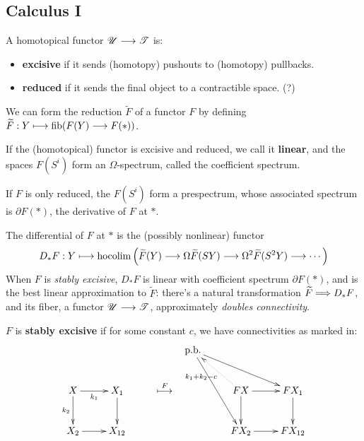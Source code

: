 \documentclass[11pt]{article}
\begin{document}
\begin{Calculus I}
\section*{Calculus I}
\begin{itemise}
\setlength{\parindent}{.25in}
\item A homotopical functor $\mathscr{U}\longrightarrow\mathscr{T}$ is:
\begin{itemize}\squishlist
\setlength{\parindent}{.25in}
\item  \textbf{excisive} if it sends (homotopy) pushouts to (homotopy) pullbacks.
\item \textbf{reduced} if it sends the final object to a contractible space. (?)
\end{itemize}
\item We can  form the reduction $\widetilde{F}$ of a functor $F$ by defining $\widetilde{F}:Y\longmapsto\operatorname{fib}(F(Y)\longrightarrow F(*))$.
\item If the (homotopical) functor is excisive and reduced, we call it \textbf{linear}, and the spaces $F(S^i)$ form an $\Omega$-spectrum, called the coefficient spectrum.
\item If $F$ is only reduced, the $F(S^i)$ form a prespectrum, whose associated spectrum is $\partial F(*)$, the derivative of $F$ at $*$.
\item The differential of $F$ at $*$ is the (possibly nonlinear) functor
\[D_*F:Y\longmapsto\operatorname*{hocolim}\left(\widetilde{F}(Y)\longrightarrow\Omega\widetilde{F}(SY)\longrightarrow\Omega^2\widetilde{F}(S^2Y)\longrightarrow\cdots \right)\]
When $F$ is \emph{stably excisive}, $D_*F$ is linear with coefficient spectrum $\partial F(*)$, and is the best linear approximation to $\widetilde{F}$: there's a natural transformation $\widetilde{F}\Longrightarrow D_*F$, and its fiber, a functor $\mathscr{U}\longrightarrow\mathscr{T}$, approximately \emph{doubles connectivity}.

$F$ is \textbf{stably excisive} if for some constant $c$, we have connectivities as marked in:
\[\xymatrix{
&%
&%
&%
\textup{p.b.}
\ar[rrd]
\ar[rdd]
&%
&%
\\%
X\ar[r]_-{k_1}
\ar[d]_-{k_2}
&%
X_1
\ar[d]
&%
\makebox[0cm][l]{\,$\overset{F}{\mapsto}$}&%
&
FX
\ar@{..>}[ul]^-{k_1+k_2-c}
\ar[r]
\ar[d]
&%
FX_1
\ar[d]
\\%
X_2\ar[r]
&%
X_{12}
&%
&&%
FX_{2}
\ar[r]
&%
FX_{12}
}\]


\end{itemise}
\end{Calculus I}
\end{document}
